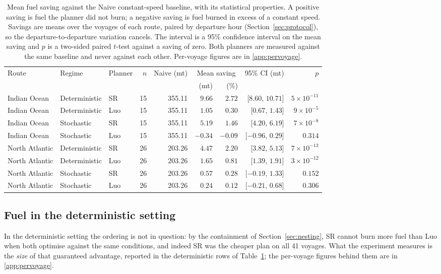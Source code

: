 \documentclass[review,authoryear]{elsarticle}
\begin{document}
\begin{table}[ht]
\centering
\small
\caption{Mean fuel saving against the Naive constant-speed baseline, with its
statistical properties. A positive saving is fuel the planner did not burn; a negative
saving is fuel burned in excess of a constant speed. Savings are means over the voyages
of each route, paired by departure hour (Section~\ref{sec:protocol}), so the
departure-to-departure variation cancels. The interval is a 95\% confidence interval on
the mean saving and $p$ is a two-sided paired $t$-test against a saving of zero. Both
planners are measured against the same baseline and never against each other.
Per-voyage figures are in \ref{app:pervoyage}.}
\label{tab:regimes}
\begin{tabular}{lllrrrrrr}
\toprule
Route & Regime & Planner & $n$ & Naive (mt) & \multicolumn{2}{c}{Mean saving} & 95\% CI (mt) & $p$ \\
\cmidrule(lr){6-7}
 & & & & & (mt) & (\%) & & \\
\midrule
Indian Ocean & Deterministic & SR & 15 & 355.11 & $9.66$ & $2.72$ & [$8.60$, $10.71$] & $5\times 10^{-11}$ \\
Indian Ocean & Deterministic & Luo & 15 & 355.11 & $1.05$ & $0.30$ & [$0.67$, $1.43$] & $9\times 10^{-5}$ \\
Indian Ocean & Stochastic & SR & 15 & 355.11 & $5.19$ & $1.46$ & [$4.20$, $6.19$] & $7\times 10^{-8}$ \\
Indian Ocean & Stochastic & Luo & 15 & 355.11 & $-0.34$ & $-0.09$ & [$-0.96$, $0.29$] & $0.314$ \\
\midrule
North Atlantic & Deterministic & SR & 26 & 203.26 & $4.47$ & $2.20$ & [$3.82$, $5.13$] & $7\times 10^{-13}$ \\
North Atlantic & Deterministic & Luo & 26 & 203.26 & $1.65$ & $0.81$ & [$1.39$, $1.91$] & $3\times 10^{-12}$ \\
North Atlantic & Stochastic & SR & 26 & 203.26 & $0.57$ & $0.28$ & [$-0.19$, $1.33$] & $0.152$ \\
North Atlantic & Stochastic & Luo & 26 & 203.26 & $0.24$ & $0.12$ & [$-0.21$, $0.68$] & $0.306$ \\
\bottomrule
\end{tabular}
\end{table}
\subsection{Fuel in the deterministic setting}
\label{sec:res-det}
In the deterministic setting the ordering is not in question: by the containment of
Section~\ref{sec:nesting}, SR cannot burn more fuel than Luo when both optimise against the same
conditions, and indeed SR was the cheaper plan on all 41 voyages. What the experiment measures is the
\emph{size} of that guaranteed advantage, reported in the deterministic rows of
Table~\ref{tab:regimes}; the per-voyage figures behind them are in \ref{app:pervoyage}.
\end{document}
